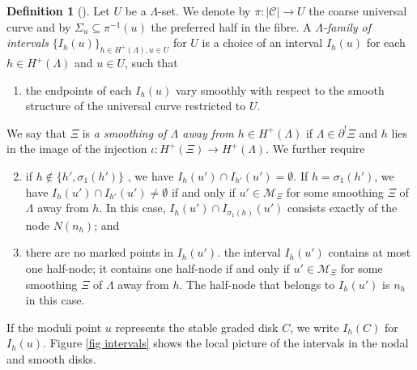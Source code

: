 \documentclass[11pt]{amsart}
\theoremstyle{definition}
\newtheorem{definition}[dummy]{Definition}
\theoremstyle{remark}
\newcommand{\<}{\left<}
\renewcommand{\>}{\right>}
\numberwithin{equation}{section}
\begin{document}
\begin{definition}[{\cite[Definition 3.4]{BCT2}}]
Let $U$ be a $\Lambda$-set. We denote by $\pi:\lvert\mathcal C\rvert\to U$ the coarse universal curve and by $\Sigma_u \subseteq \pi^{-1}(u)$ the preferred half in the fibre. A \textit{$\Lambda$-family of intervals} $\{I_{h}(u)\}_{h\in{H^+}(\Lambda),u\in U}$ for $U$ is a choice of an interval $I_{h}(u)$ for each $h\in{H^+}(\Lambda)$ and $u\in U$, %
such that
\begin{enumerate}
\item
the endpoints %
of each $I_h(u)$ vary smoothly with respect to the smooth structure of the universal curve restricted to $U$.
\end{enumerate}
We say that $\Xi$ is \textit{a smoothing of $\Lambda$ away from $h\in H^+(\Lambda)$} if $\Lambda\in\partial^!\Xi$ and $h$ lies in the image of the injection $\iota:H^+(\Xi)\to H^+(\Lambda)$. We further %
require 
\begin{enumerate}
\setcounter{enumi}{1}
\item
if $h \notin\{ h', \sigma_1(h')\}$%
, we have $I_h(u')\cap I_{h'}(u')=\emptyset$.  If $h=\sigma_1(h')$, we have $I_h(u')\cap I_{h'}(u')\neq\emptyset$ if and only if $u'\in{\mathcal M}_\Xi$ for some smoothing $\Xi$ of $\Lambda$ away from $h$.
  In this case, $I_h(u')\cap I_{\sigma_1(h)}(u')$ consists exactly of the %
node $N(n_{h})$; and
\item there are %
no marked points in $I_h(u')$. the interval $I_h(u')$ contains at most one half-node; it contains one half-node if and only if $u'\in{\mathcal M}_\Xi$ for some smoothing $\Xi$ of $\Lambda$ away from $h$. The half-node that belongs to $I_h(u')$ is $n_{h}$ in this case.
\end{enumerate}

If the moduli point $u$ represents the stable graded %
disk $C$, we %
write $I_h(C)$ for $I_h(u).$ Figure \ref{fig intervals} shows the local picture of the intervals in the nodal and smooth disks.
\end{definition}
\end{document}
